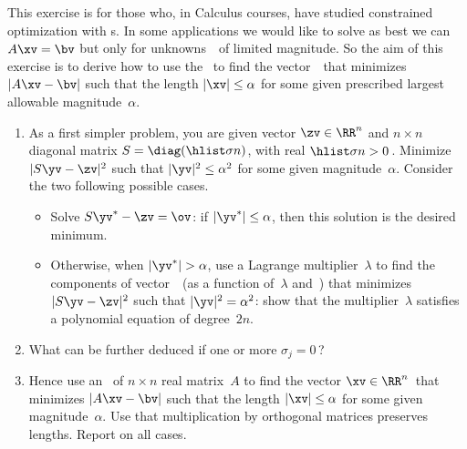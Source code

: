 \begin{exercise}  
This exercise is for those who, in Calculus courses, have studied constrained optimization with s. 
In some applications we would like to solve as best we can \(A\xv=\bv\) but only for unknowns~\xv\ of limited magnitude.
So the aim of this exercise is to derive how to use the \svd\ to find the vector~\xv\ that minimizes \(|A\xv-\bv|\) such that the length \(|\xv|\leq\alpha\) for some given prescribed largest allowable magnitude~\(\alpha\).
\begin{enumerate}
\item As a first simpler problem, you are given vector \(\zv\in\RR^n\) and \(n\times n\) diagonal matrix \(S=\diag(\hlist\sigma n)\), with real \(\hlist\sigma n>0\)\,.
Minimize \(|S\yv-\zv|^2\) such that \(|\yv|^2\leq\alpha^2\) for some given magnitude~\(\alpha\).
Consider the two following possible cases.
\begin{itemize}
\item Solve \(S\yv^*-\zv=\ov\): if \(|\yv^*|\leq\alpha\), then this solution is the desired minimum.
\item Otherwise, when \(|\yv^*|>\alpha\), use a Lagrange multiplier~\(\lambda\) to find the components of vector~\yv\ (as a function of~\(\lambda\) and~\zv) that minimizes \(|S\yv-\zv|^2\) such that \(|\yv|^2=\alpha^2\):  show that the multiplier~\(\lambda\) satisfies a polynomial equation of degree~\(2n\).
\end{itemize}

\item What can be further deduced if one or more \(\sigma_j=0\)\,?

\item Hence use an \svd\ of \(n\times n\) real matrix~\(A\) to find the vector \(\xv\in\RR^n\)\ that minimizes \(|A\xv-\bv|\) such that the length \(|\xv|\leq\alpha\) for some given magnitude~\(\alpha\).
Use that multiplication by orthogonal matrices preserves lengths.
Report on all cases.
\end{enumerate}
\end{exercise}






